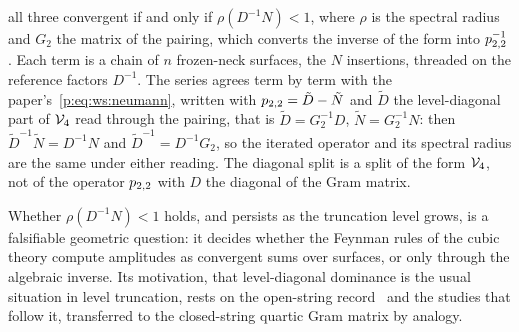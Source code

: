 all three convergent if and only if $\rho(D^{-1} N) < 1$, where $\rho$ is the spectral radius and $G_2$ the matrix of the pairing, which converts the inverse of the form into $p_{2,2}^{-1}$.
Each term is a chain of $n$ frozen-neck surfaces, the $N$ insertions, threaded on the reference factors $D^{-1}$.
The series agrees term by term with the paper's~\eqref{p:eq:ws:neumann}, written with $p_{2,2} = \tilde D - \tilde N$ and $\tilde D$ the level-diagonal part of $\mathcal{V}_{4}$ read through the pairing, that is $\tilde D = G_2^{-1} D$, $\tilde N = G_2^{-1} N$: then $\tilde D^{-1} \tilde N = D^{-1} N$ and $\tilde D^{-1} = D^{-1} G_2$, so the iterated operator and its spectral radius are the same under either reading.
The diagonal split is a split of the form $\mathcal{V}_{4}$, not of the operator $p_{2,2}$ with $D$ the diagonal of the Gram matrix.

Whether $\rho(D^{-1} N) < 1$ holds, and persists as the truncation level grows, is a falsifiable geometric question: it decides whether the Feynman rules of the cubic theory compute amplitudes as convergent sums over surfaces, or only through the algebraic inverse.
Its motivation, that level-diagonal dominance is the usual situation in level truncation, rests on the open-string record~\cite{Moeller:2000:LevelTruncationTachyon} and the studies that follow it, transferred to the closed-string quartic Gram matrix by analogy.

